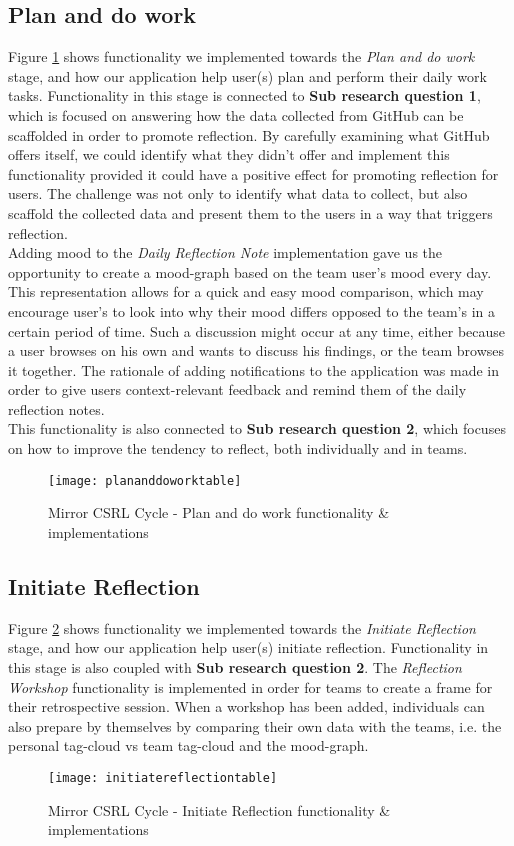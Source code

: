 \subsection{Plan and do work}
Figure \ref{plananddoworktable} shows functionality we implemented towards the \emph{Plan and do work} stage, and how our application help user(s) plan and perform their daily work tasks. 
Functionality in this stage is connected to \textbf{Sub research question 1}, which is focused on answering how the data collected from GitHub can be scaffolded in order to promote reflection. By carefully examining what GitHub offers itself, we could identify what they didn't offer and implement this functionality provided it could have a positive effect for promoting reflection for users. The challenge was not only to identify what data to collect, but also scaffold the collected data and present them to the users in a way that triggers reflection. \\
Adding mood to the \emph{Daily Reflection Note} implementation gave us the opportunity to create a mood-graph based on the team user's mood every day. This representation allows for a quick and easy mood comparison, which may encourage user's to look into why their mood differs opposed to the team's in a certain period of time. Such a discussion might occur at any time, either because a user browses on his own and wants to discuss his findings, or the team browses it together.  
The rationale of adding notifications to the application was made in order to give users context-relevant feedback and remind them of the daily reflection notes. \\
This functionality is also connected to \textbf{Sub research question 2}, which focuses on how to improve the tendency to reflect, both individually and in teams. 
\begin{figure}[H]
\centering
    \texttt{[image: plananddoworktable]}
\caption{Mirror CSRL Cycle - Plan and do work functionality \& implementations}
\label{plananddoworktable}
\end{figure}

\subsection{Initiate Reflection}
Figure \ref{initiatereflectiontable} shows functionality we implemented towards the \emph{Initiate Reflection} stage, and how our application help user(s) initiate reflection. Functionality in this stage is also coupled with \textbf{Sub research question 2}. The \emph{Reflection Workshop} functionality is implemented in order for teams to create a frame for their retrospective session. When a workshop has been added, individuals can also prepare by themselves by comparing their own data with the teams, i.e. the personal tag-cloud vs team tag-cloud and the mood-graph.  
\begin{figure}[H]
\centering
    \texttt{[image: initiatereflectiontable]}
\caption{Mirror CSRL Cycle - Initiate Reflection functionality \& implementations}
\label{initiatereflectiontable}
\end{figure}

